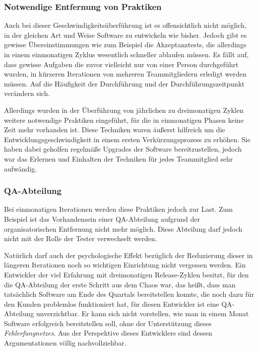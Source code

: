 \subsubsection{Notwendige Entfernung von Praktiken}
\label{minisec:monat-entfernte-praktiken}
Auch bei dieser Geschwindigkeitsüberführung ist es offensichtlich nicht
möglich, in der gleichen Art und Weise Software zu entwickeln wie bisher.
Jedoch gibt es gewisse Übereinstimmungen wie zum Beispiel die Akzeptanztests, die
allerdings in einem einmonatigen Zyklus wesentlich schneller ablaufen müssen.
Es fällt auf, dass  gewisse Aufgaben die zuvor vielleicht nur von einer Person
durchgeführt wurden, in kürzeren Iterationen von mehreren Teammitgliedern
erledigt werden müssen. Auf die Häufigkeit der Durchführung und der
Durchführungszeitpunkt verändern sich.

Allerdings wurden in der Überführung von jährlichen zu dreimonatigen Zyklen
weitere notwendige Praktiken eingeführt, für die in einmonatigen Phasen keine
Zeit mehr vorhanden ist. Diese Techniken waren äußerst hilfreich um die
Entwicklungsgeschwindigkeit in einem ersten Verkürzungsprozess zu erhöhen. Sie
haben dabei geholfen regelmäße Upgrades der Software bereitzustellen, jedoch
war das Erlernen und Einhalten der Techniken für jedes Teammitglied sehr
aufwändig.

\subsubsection{QA-Abteilung}
\label{minisec:qa-abteilung}

Bei einmonatigen Iterationen werden diese Praktiken jedoch zur Last. Zum Beispiel ist
das Vorhandensein einer QA-Abteilung aufgrund der organisatorischen Entfernung
nicht mehr möglich. Diese Abteilung darf jedoch nicht mit der Rolle der Tester
verwechselt werden.

Natürlich darf auch der psychologische Effekt bezüglich der Reduzierung
dieser in längeren Iterationen noch so wichtigen Einrichtung nicht vergessen
werden.  Ein Entwickler der viel Erfahrung mit dreimonatigen Release-Zyklen
besitzt, für den die QA-Abteilung der erste Schritt aus dem Chaos war, das heißt,
dass man tatsächlich Software am Ende des Quartals bereitstellen konnte, die noch
dazu für den Kunden problemlos funktioniert hat, für diesen Entwickler ist
eine QA-Abteilung unverzichtbar. Er kann sich nicht vorstellen, wie man in
einem Monat Software erfolgreich bereitstellen soll, ohne der Unterstützung
dieses \emph{Fehlerfangnetzes}. Aus der Perspektive dieses Entwicklers sind
dessen Argumentationen völlig nachvollziehbar.

